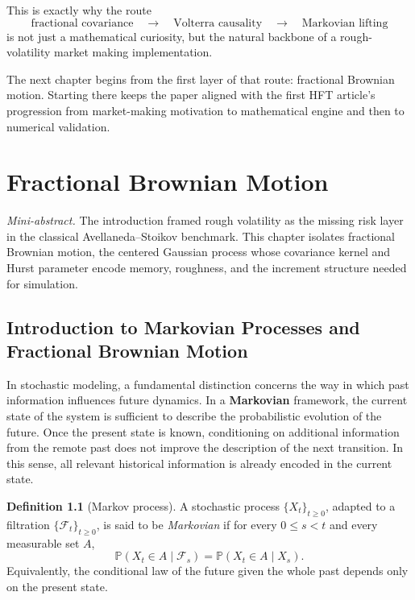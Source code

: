 \documentclass[a4paper,10pt,titlepage,oneside,openany]{book}
\theoremstyle{plain}
\theoremstyle{definition}
\newtheorem{definition}{Definition}[chapter]
\theoremstyle{remark}
\newcommand{\miniabstract}[1]{%
\vspace{-2pt}
\begin{tcolorbox}[colback=gray!6,colframe=black!15,boxrule=0.3pt,arc=3pt,left=6pt,right=6pt,top=4pt,bottom=4pt]
\textit{Mini-abstract.} #1
\end{tcolorbox}
\vspace{-4pt}
}
\newcommand{\1}{\mathbf{1}}
\begin{document}
This is exactly why the route
\[
\text{fractional covariance} \quad \longrightarrow \quad \text{Volterra causality} \quad \longrightarrow \quad \text{Markovian lifting}
\]
is not just a mathematical curiosity, but the natural backbone of a rough-volatility market making implementation.

The next chapter begins from the first layer of that route: fractional Brownian motion. Starting there keeps the paper aligned with the first HFT article's progression from market-making motivation to mathematical engine and then to numerical validation.

\mainmatter
\clearpage
\setcounter{page}{1}

\chapter{Fractional Brownian Motion}
\miniabstract{The introduction framed rough volatility as the missing risk layer in the classical Avellaneda--Stoikov benchmark. This chapter isolates fractional Brownian motion, the centered Gaussian process whose covariance kernel and Hurst parameter encode memory, roughness, and the increment structure needed for simulation.}

\section{Introduction to Markovian Processes and Fractional Brownian Motion}

In stochastic modeling, a fundamental distinction concerns the way in which past information influences future dynamics. In a \textbf{Markovian} framework, the current state of the system is sufficient to describe the probabilistic evolution of the future. Once the present state is known, conditioning on additional information from the remote past does not improve the description of the next transition. In this sense, all relevant historical information is already encoded in the current state.

\begin{definition}[Markov process]
A stochastic process \(\{X_t\}_{t\ge 0}\), adapted to a filtration \(\{\mathcal{F}_t\}_{t\ge 0}\), is said to be \emph{Markovian} if for every \(0\le s<t\) and every measurable set \(A\),
\[
\mathbb{P}(X_t\in A\mid \mathcal{F}_s)
=
\mathbb{P}(X_t\in A\mid X_s).
\]
Equivalently, the conditional law of the future given the whole past depends only on the present state.
\end{definition}
\end{document}
